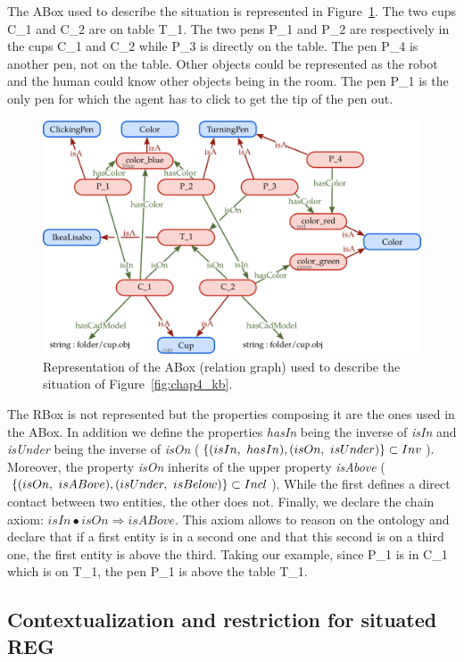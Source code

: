 The ABox used to describe the situation is represented in Figure~\ref{fig:chap4_kb_Abox}. The two cups C\_1 and C\_2 are on table T\_1. The two pens P\_1 and P\_2 are respectively in the cups C\_1 and C\_2 while P\_3 is directly on the table. The pen P\_4 is another pen, not on the table. Other objects could be represented as the robot and the human could know other objects being in the room. The pen P\_1 is the only pen for which the agent has to click to get the tip of the pen out.

\begin{figure}[ht!]
\centering
\includegraphics[scale=0.38]{figures/chapter4/pens_Abox.png}
\caption{\label{fig:chap4_kb_Abox} Representation of the ABox (relation graph) used to describe the situation of Figure~\ref{fig:chap4_kb}. }
\end{figure}

The RBox is not represented but the properties composing it are the ones used in the ABox. In addition we define the properties \textit{hasIn} being the inverse of \textit{isIn} and \textit{isUnder} being the inverse of \textit{isOn} ($\{(isIn,\ hasIn), (isOn,\ isUnder)\} \subset \invset$). Moreover, the property \textit{isOn} inherits of the upper property \textit{isAbove} ($\{(isOn,\ isABove), (isUnder,\ isBelow)\} \subset Incl$). While the first defines a direct contact between two entities, the other does not. Finally, we declare the chain axiom: $isIn \bullet isOn \Rightarrow isABove$. This axiom allows to reason on the ontology and declare that if a first entity is in a second one and that this second is on a third one, the first entity is above the third. Taking our example, since P\_1 is in C\_1 which is on T\_1, the pen P\_1 is above the table T\_1.

\subsection{Contextualization and restriction for situated REG}

